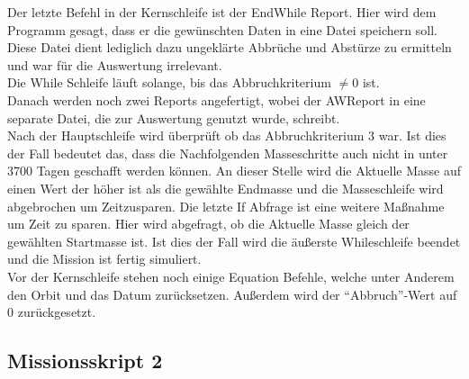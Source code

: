 Der letzte Befehl in der Kernschleife ist der EndWhile Report. Hier wird dem Programm gesagt, dass er die gewünschten Daten in eine Datei speichern soll. Diese Datei dient lediglich dazu ungeklärte Abbrüche und Abstürze zu ermitteln und war für die Auswertung irrelevant.\\
Die While Schleife läuft solange, bis das Abbruchkriterium $\neq 0$ ist.\\
Danach werden noch zwei Reports angefertigt, wobei der AWReport in eine separate Datei, die zur Auswertung genutzt wurde, schreibt.\\
Nach der Hauptschleife wird überprüft ob das Abbruchkriterium 3 war. Ist dies der Fall bedeutet das, dass die Nachfolgenden Masseschritte auch nicht in unter 3700 Tagen geschafft werden können. An dieser Stelle wird die Aktuelle Masse auf einen Wert der höher ist als die gewählte Endmasse und die Masseschleife wird abgebrochen um Zeitzusparen. Die letzte If Abfrage ist eine weitere Maßnahme um Zeit zu sparen. Hier wird abgefragt, ob die Aktuelle Masse gleich der gewählten Startmasse ist. Ist dies der Fall wird die äußerste Whileschleife beendet und die Mission ist fertig simuliert.\\
Vor der Kernschleife stehen noch einige Equation Befehle, welche unter Anderem den Orbit und das Datum zurücksetzen. Außerdem wird der “Abbruch”-Wert auf 0 zurückgesetzt.




\subsection{Missionsskript 2}


